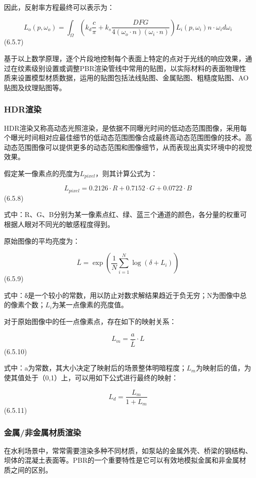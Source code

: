 因此，反射率方程最终可以表示为：

\[L_o(p, \omega_o) = \int_{\Omega} \left(k_d \frac{c}{\pi} + k_s \frac{DFG}{4(\omega_o \cdot n)(\omega_i \cdot n)}\right) L_i(p, \omega_i) n \cdot \omega_i d\omega_i\]
(6.5.7)

基于以上数学原理，逐个片段地控制每个表面上特定的点对于光线的响应效果，通过在纹素级别设置或调整PBR渲染管线中常用的贴图，以实际材料的表面物理性质来设置模型材质数据，运用的贴图包括法线贴图、金属贴图、粗糙度贴图、AO贴图及纹理贴图等。

\subsubsection{HDR渲染}\label{hdrux6e32ux67d3}

HDR渲染又称高动态光照渲染，是依据不同曝光时间的低动态范围图像，采用每个曝光时间相对应最佳细节的低动态范围图像合成最终高动态范围图像的技术。高动态范围图像可以提供更多的动态范围和图像细节，从而表现出真实环境中的视觉效果。

假定某一像素点的亮度为\(L_{pixel}\)，则其计算公式为：

\[L_{pixel} = 0.2126 \cdot R + 0.7152 \cdot G + 0.0722 \cdot B\] (6.5.8)

式中：R、G、B分别为某一像素点红、绿、蓝三个通道的颜色，各分量的权重可根据人眼对不同光的敏感程度得到。

原始图像的平均亮度为：

\[\bar{L} = \exp\left(\frac{1}{N}\sum_{i=1}^{N} \log(\delta + L_i)\right)\]
(6.5.9)

式中：δ是一个较小的常数，用以防止对数求解结果趋近于负无穷；N为图像中总的像素个数；\(L_i\)为某一点像素的亮度值。

对于原始图像中的任一点像素点，存在如下的映射关系：

\[L_m = \frac{a}{\bar{L}} \cdot L\] (6.5.10)

式中：a为常数，其大小决定了映射后的场景整体明暗程度；\(L_m\)为映射后的值，为使其值处于（0,1）上，可以用如下公式进行最终的映射：

\[L_d = \frac{L_m}{1 + L_m}\] (6.5.11)

\subsubsection{金属/非金属材质渲染}\label{ux91d1ux5c5eux975eux91d1ux5c5eux6750ux8d28ux6e32ux67d3}

在水利场景中，常常需要渲染多种不同材质，如泵站的金属外壳、桥梁的钢结构、坝体的混凝土表面等。PBR的一个重要特性是它可以有效地模拟金属和非金属材质之间的区别。

